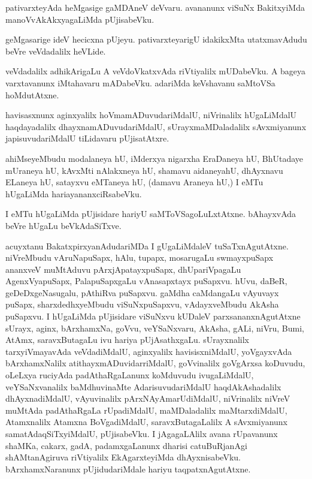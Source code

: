 \documentclass{article}
\begin{document}
\begin{mn}%
pativarxteyAda heMgasige gaMDAneV deVvaru. avananunx viSuNx BakitxyiMda 
manoVvAkAkxyagaLiMda pUjisabeVku.
\end{mn}

\begin{mn}%
geMgasarige ideV hecicxna pUjeyu. pativarxteyarigU idakikxMta utatxmavAdudu beVre 
veVdadalilx heVLide.
\end{mn}

\begin{mn}%
veVdadalilx adhikArigaLu A veVdoVkatxvAda riVtiyalilx mUDabeVku. A bageya varxtavanunx 
iMtahavaru mADabeVku. adariMda keVshavanu saMtoVSa hoMdutAtxne.
\end{mn}

\begin{mn}%
havisasxnunx aginxyalilx hoVmamADuvudariMdalU, niVrinalilx hUgaLiMdalU haqdayadalilx 
dhayxnamADuvudariMdalU, sUrayxmaMDaladalilx sAvxmiyanunx japisuvudariMdalU tiLidavaru 
pUjisatAtxre.
\end{mn}

\begin{mn}%
ahiMseyeMbudu modalaneya hU, iMderxya nigarxha EraDaneya hU, BhUtadaye mUraneya hU, 
kAvxMti nAlakxneya hU, shamavu aidaneyahU, dhAyxnavu ELaneya hU, satayxvu eMTaneya hU,
(damavu Araneya hU,) I eMTu hUgaLiMda hariayananxciRsabeVku.
\end{mn}

\begin{mn}%
I eMTu hUgaLiMda pUjisidare hariyU saMToVSagoLuLxtAtxne. bAhayxvAda beVre hUgaLu 
beVkAdaSiTxve.
\end{mn}

\begin{mn}%
acuyxtanu BakatxpirxyanAdudariMDa I gUgaLiMdaleV tuSaTxnAgutAtxne. niVreMbudu 
vAruNapuSapx, hAlu, tupapx, mosarugaLu swmayxpuSapx ananxveV muMtAduvu 
pArxjApatayxpuSapx, dhUpariVpagaLu AgenxVyapuSapx,  PalapuSapxgaLu vAnasapxtayx puSapxvu. 
hUvu, daBeR, geDeDxgeNasugalu, pAthiRva puSapxvu. gaMdha caMdangaLu vAyuvayx puSapx, 
sharxdedhxyeMbudu viSuNxpuSapxvu, vAdayxveMbudu AkAsha puSapxvu. I hUgaLiMda pUjisidare 
viSuNxvu kUDaleV parxsananxnAgutAtxne sUrayx, aginx, bArxhamxNa, goVvu, veYSaNxvaru, 
AkAsha, gALi, niVru, Bumi, AtAmx, saravxButagaLu ivu hariya pUjAsathxgaLu. sUrayxnalilx 
tarxyiVmayavAda veVdadiMdalU, aginxyalilx havisisxniMdalU, yoVgayxvAda bArxhamxNalilx 
atithayxmADuvidarriMdalU, goVvinalilx goVgArxsa koDuvudu, oLeLxya ruciyAda 
padAthaRgaLanunx koMduvudu ivugaLiMdalU, veYSaNxvanalilx baMdhuvinaMte AdarisuvudariMdalU 
haqdAkAshadalilx dhAyxnadiMdalU, vAyuvinalilx pArxNAyAmarUdiMdalU, niVrinalilx niVreV 
muMtAda padAthaRgaLa rUpadiMdalU, maMDaladalilx maMtarxdiMdalU, Atamxnalilx Atamxna 
BoVgadiMdalU, saravxButagaLalilx A sAvxmiyanunx samatAdaqSiTxyiMdalU, pUjisabeVku. I 
jAgagaLAlilx avana rUpavanunx shaMKa, cakarx, gadA, padamxgaLanunx dharisi catuBuRjanAgi 
shAMtanAgiruva riVtiyalilx EkAgarxteyiMda dhAyxnisabeVku. bArxhamxNaranunx 
pUjidudariMdale hariyu taqpatxnAgutAtxne.
\end{mn}
\end{document}

